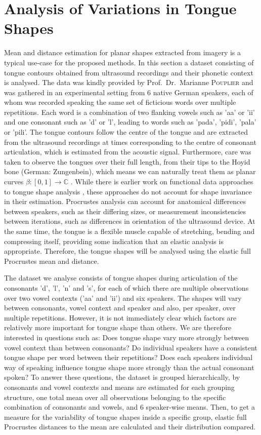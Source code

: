 \section{Analysis of Variations in Tongue Shapes}
\label{sec:4-tounges}
Mean and distance estimation for planar shapes extracted from imagery is a typical use-case for the proposed methods.
In this section a dataset consisting of tongue contours obtained from ultrasound recordings and their phonetic context is analysed.
The data was kindly provided by Prof.\ Dr.\ Marianne \textsc{Pouplier} and was gathered in an experimental setting from 6 native German speakers, each of whom was recorded speaking the same set of ficticious words over multiple repetitions.
Each word is a combination of two flanking vowels such as 'aa' or 'ii' and one consonant such as 'd' or 'l', leading to words such as 'pada', 'pidi', 'pala' or 'pili'.
The tongue contours follow the centre of the tongue and are extracted from the ultrasound recordings at times corresponding to the centre of consonant articulation, which is estimated from the acoustic signal.
Furthermore, care was taken to observe the tongues over their full length, from their tips to the Hoyid bone (German: Zungenbein),  which means we can naturally treat them as planar curves $\beta : [0,1] \rightarrow \mathbb{C}$ \parencite[see][]{consulting}.
While there is earlier work on functional data approaches to tongue shape analysis \parencite{CederbaumEtAl2016,Davidson2006,PouplierEtAl2014}, these approaches do not account for shape invariance in their estimation.
Procrustes analysis can account for anatomical differences between speakers, such as their differing sizes, or measurement inconsistencies between iterations, such as differences in orientation of the ultrasound device.
At the same time, the tongue is a flexible muscle capable of stretching, bending and compressing itself, providing some indication that an elastic analysis is appropriate. 
Therefore, the tongue shapes will be analysed using the elastic full Procrustes mean and distance.

The dataset we analyse consists of tongue shapes during articulation of the consonants 'd', 'l', 'n' and 's', for each of which there are multiple observations over two vowel contexts ('aa' and 'ii') and six speakers.
The shapes will vary between consonants, vowel context and speaker and also, per speaker, over multiple repetitions.
However, it is not immediately clear which factors are relatively more important for tongue shape than others.
We are therefore interested in questions such as:
Does tongue shape vary more strongly between vowel context than between consonants?
Do individual speakers have a consistent tongue shape per word between their repetitions?
Does each speakers individual way of speaking influence tongue shape more strongly than the actual consonant spoken?
To answer these questions, the dataset is grouped hierarchically, by consonants and vowel contexts and means are estimated for each grouping structure, one total mean over all observations belonging to the specific combination of consonants and vowels, and 6 speaker-wise means.
Then, to get a measure for the variability of tongue shapes inside a specific group, elastic full Procrustes distances to the mean are calculated and their distribution compared.

